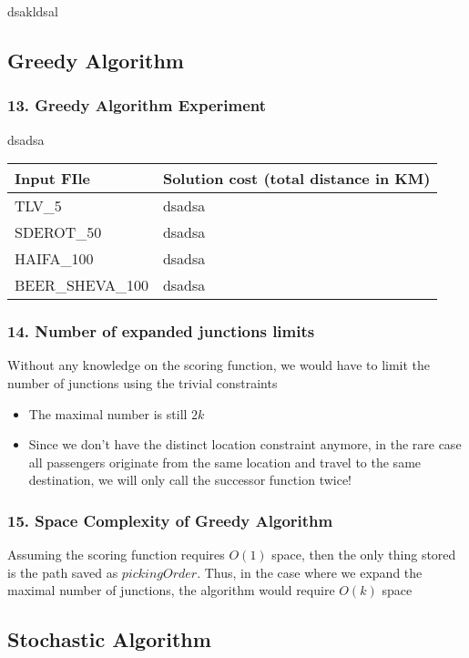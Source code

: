 \documentclass{article}
\begin{document}
dsakldsal \\

\subsection*{Greedy Algorithm}
\subsubsection*{13. Greedy Algorithm Experiment}
dsadsa
\begin{table}[]
\begin{center}
\begin{tabular}{l l}
\hline
\textbf{Input FIle} & \textbf{Solution cost (total distance in KM)} \\ \hline
TLV\_5 & dsadsa \\ \hline
SDEROT\_50 & dsadsa \\ \hline
HAIFA\_100 & dsadsa \\ \hline
BEER\_SHEVA\_100 & dsadsa \\ 
\hline\hline
\end{tabular}
\end{center}
\end{table}

\subsubsection*{14. Number of expanded junctions limits}
Without any knowledge on the scoring function, we would have to limit the number of junctions using the trivial constraints
\begin{itemize}
\item The maximal number is still $2k$
\item Since we don't have the distinct location constraint anymore, in the rare case all passengers originate from the same location and travel to the same destination, we will only call the successor function twice!
\end{itemize}

\subsubsection*{15. Space Complexity of Greedy Algorithm}
Assuming the scoring function requires $O(1)$ space, then the only thing stored is the path saved as $pickingOrder$. Thus, in the case where we expand the maximal number of junctions, the algorithm would require $O(k)$ space

\subsection*{Stochastic Algorithm}
\end{document}
